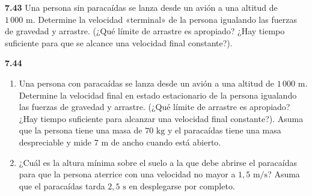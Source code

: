 \documentclass[12pt]{book}
\begin{document}
\textbf{7.43} Una persona sin paracaídas se lanza desde un avión a una altitud de $1\,000\text{ m}$. Determine la velocidad «terminal» de la persona igualando las fuerzas de gravedad y arrastre. (¿Qué límite de arrastre es apropiado? ¿Hay tiempo suficiente para que se alcance una velocidad final constante?).

\textbf{7.44}
\begin{enumerate}
  \item[(a)] Una persona con paracaídas se lanza desde un avión a una altitud de $1\,000\text{ m}$. Determine la velocidad final en estado estacionario de la persona igualando las fuerzas de gravedad y arrastre. (¿Qué límite de arrastre es apropiado? ¿Hay tiempo suficiente para alcanzar una velocidad final constante?). Asuma que la persona tiene una masa de $70\text{ kg}$ y el paracaídas tiene una masa despreciable y mide $7\text{ m}$ de ancho cuando está abierto.
  \item[(b)] ¿Cuál es la altura mínima sobre el suelo a la que debe abrirse el paracaídas para que la persona aterrice con una velocidad no mayor a $1{,}5\text{ m/s}$? Asuma que el paracaídas tarda $2{,}5\text{ s}$ en desplegarse por completo.
\end{enumerate}
\end{document}
